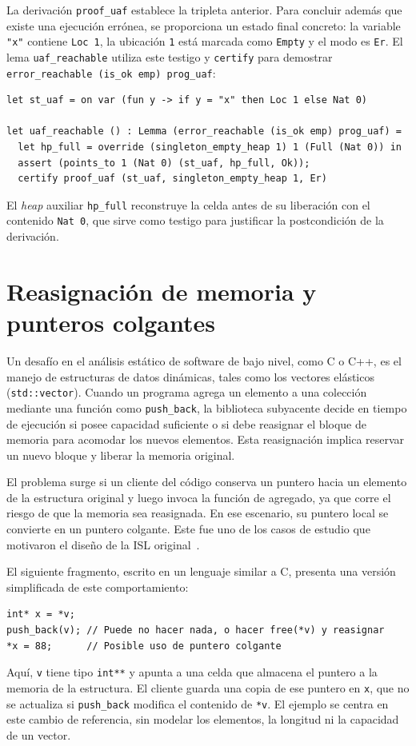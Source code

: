 \documentclass[a4paper,	11pt]{report}
\newif\ifdraft\drafttrue
\newcommand{\comm}[3]{\ifdraft{{\color{#1}[#2: #3]}}\fi}
\newcommand{\guido}[1]{\comm{blue}{Guido}{#1}}
\begin{document}
La derivación \lstinline|proof_uaf| establece la tripleta anterior.
Para concluir además que existe una ejecución errónea,
se proporciona un estado final concreto:
la variable \lstinline|"x"| contiene \lstinline|Loc 1|,
la ubicación \lstinline|1| está marcada como \lstinline|Empty| y el modo es \lstinline|Er|.
El lema \lstinline|uaf_reachable| utiliza este testigo y \lstinline|certify| para demostrar \lstinline|error_reachable (is_ok emp) prog_uaf|:

\begin{lstlisting}
let st_uaf = on var (fun y -> if y = "x" then Loc 1 else Nat 0)

let uaf_reachable () : Lemma (error_reachable (is_ok emp) prog_uaf) =
  let hp_full = override (singleton_empty_heap 1) 1 (Full (Nat 0)) in
  assert (points_to 1 (Nat 0) (st_uaf, hp_full, Ok));
  certify proof_uaf (st_uaf, singleton_empty_heap 1, Er)
\end{lstlisting}
El \emph{heap} auxiliar \lstinline|hp_full| reconstruye la celda antes de su liberación con el contenido \lstinline|Nat 0|,
que sirve como testigo para justificar la postcondición de la derivación.

\section{Reasignación de memoria y punteros colgantes}
\label{sec:pushback}
Un desafío en el análisis estático de software de bajo nivel,
como C o C++,
es el manejo de estructuras de datos dinámicas,
tales como los vectores elásticos (\lstinline|std::vector|).
Cuando un programa agrega un elemento a una colección mediante una función como \lstinline|push_back|,
la biblioteca subyacente decide en tiempo de ejecución si posee capacidad suficiente o si debe reasignar el bloque de memoria para acomodar los nuevos elementos.
Esta reasignación implica reservar un nuevo bloque y liberar la memoria original.

El problema surge si un cliente del código conserva un puntero hacia un elemento de la estructura original y luego invoca la función de agregado,
ya que corre el riesgo de que la memoria sea reasignada.
En ese escenario, su puntero local se convierte en un puntero colgante.
Este fue uno de los casos de estudio que motivaron el diseño de la ISL original~\citep{isl}.

El siguiente fragmento,
escrito en un lenguaje similar a C,
presenta una versión simplificada de este comportamiento:

\begin{lstlisting}
int* x = *v;
push_back(v); // Puede no hacer nada, o hacer free(*v) y reasignar
*x = 88;      // Posible uso de puntero colgante
\end{lstlisting}
Aquí,
\lstinline|v| tiene tipo \lstinline|int**| y apunta a una celda que almacena el puntero a la memoria de la estructura.
El cliente guarda una copia de ese puntero en \lstinline|x|,
que no se actualiza si \lstinline|push_back| modifica el contenido de \lstinline|*v|.
El ejemplo se centra en este cambio de referencia,
sin modelar los elementos,
la longitud ni la capacidad de un vector.
\end{document}
